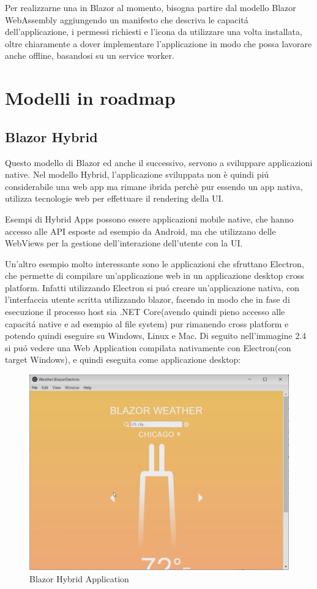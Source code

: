 Per realizzarne una in Blazor al momento, bisogna partire dal modello Blazor WebAssembly aggiungendo un manifesto che descriva le capacit\'a dell'applicazione, i permessi richiesti e l'icona da utilizzare una volta installata, oltre chiaramente a dover implementare l'applicazione in modo che possa lavorare anche offline, basandosi su un service worker.\cite{blazorPWA}
\pagebreak

\section{Modelli in roadmap}
\subsection{Blazor Hybrid}\label{sez:bhybrid}
Questo modello di Blazor ed anche il successivo, servono a sviluppare applicazioni native.
Nel modello Hybrid, l'applicazione sviluppata non \`e quindi pi\'u considerabile una web app ma rimane ibrida perch\`e pur essendo un app nativa, utilizza tecnologie web per effettuare il rendering della UI.

Esempi di Hybrid Apps possono essere applicazioni mobile native, che hanno accesso alle API esposte ad esempio da Android, ma che utilizzano delle WebViews per la gestione dell'interazione dell'utente con la UI.

Un'altro esempio molto interessante sono le applicazioni che sfruttano Electron, che permette di compilare un'applicazione web in un applicazione desktop cross platform.
Infatti utilizzando Electron si pu\'o creare un'applicazione nativa, con l'interfaccia utente scritta utilizzando blazor, facendo in modo che in fase di esecuzione il processo host sia .NET Core(avendo quindi pieno accesso alle capacit\'a native e ad esempio al file system) pur rimanendo cross platform e potendo quindi eseguire su Windows, Linux e Mac.
Di seguito nell'immagine 2.4 si pu\'o vedere una Web Application compilata nativamente con Electron(con target Windows), e quindi eseguita come applicazione desktop:

\begin{figure}[H]
	\centerline{\includegraphics[scale=0.6]{figure/BlazorWeatherElectron.png}}
	\caption{Blazor Hybrid Application}
	\label{fig:BlazorHybridApplication}
\end{figure}


